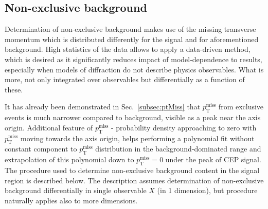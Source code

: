 \subsection{Non-exclusive background}\label{sec:nonExclBkgdDetermination}

Determination of non-exclusive background makes use of the missing transverse momentum which is distributed differently for the signal and for aforementioned background. High statistics of the data allows to apply a data-driven method, which is desired as it significantly reduces impact of model-dependence to results, especially when models of diffraction do not describe physics observables. What is more, not only integrated over observables but differentially as a function of these.

It has already been demonstrated in Sec.~\ref{subsec:ptMiss} that $p_{\text{T}}^{\text{miss}}$ from exclusive events is much narrower compared to background, visible as a peak near the axis origin. Additional feature of 
$p_{\text{T}}^{\text{miss}}$ - probability density approaching to zero with $p_{\text{T}}^{\text{miss}}$ moving towards the axis origin, helps performing a polynomial fit without constant component to $p_{\text{T}}^{\text{miss}}$ distribution in the background-dominated range and extrapolation of this polynomial down to $p_{\text{T}}^{\text{miss}} = 0$ under the peak of CEP signal. The procedure used to determine non-exclusive background content in the signal region is described below. The description assumes determination of non-exclusive background differentially in single observable $X$ (in 1 dimension), but procedure naturally applies also to more dimensions.

